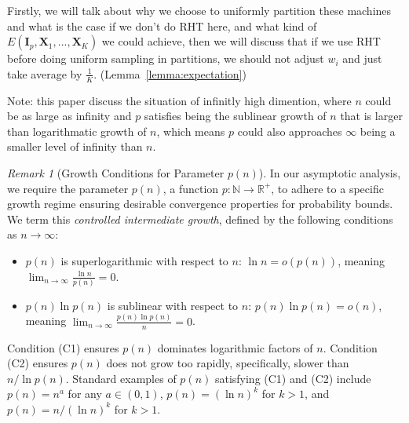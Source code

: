\documentclass[11pt]{article}
\numberwithin{equation}{section}
\theoremstyle{plain}
\theoremstyle{definition}
\theoremstyle{remark}
\newtheorem{remark}[theorem]{Remark}
\begin{document}
Firstly, we will talk about why we choose to uniformly partition these machines and what is the case if we don't do RHT here, and what kind of $E(\mathbf{I}_p,\mathbf{X}_1,...,\mathbf{X}_K)$ we could achieve, then we will discuss that if we use RHT before doing uniform sampling in partitions, we should not adjust $w_i$ and just take average by $\frac{1}{K}$. (Lemma~\ref{lemma:expectation})

Note: this paper discuss the situation of infinitly high dimention, where $n$ could be as large as infinity and $p$ satisfies being the sublinear growth of $n$ that is larger than logarithmatic growth of $n$, which means $p$ could also approaches $\infty$ being a smaller level of infinity than $n$.
\begin{remark}[Growth Conditions for Parameter $p(n)$]
\label{remark:sublinear}
In our asymptotic analysis, we require the parameter $p(n)$, a function $p: \mathbb{N} \to \mathbb{R}^+$, to adhere to a specific growth regime ensuring desirable convergence properties for probability bounds. We term this \emph{controlled intermediate growth}, defined by the following conditions as $n \to \infty$:
\begin{itemize}
    \item[(C1)] $p(n)$ is superlogarithmic with respect to $n$: $\ln n = o(p(n))$, meaning $\lim_{n \to \infty} \frac{\ln n}{p(n)} = 0$.
    \item[(C2)] $p(n)\ln p(n)$ is sublinear with respect to $n$: $p(n)\ln p(n) = o(n)$, meaning $\lim_{n \to \infty} \frac{p(n)\ln p(n)}{n} = 0$.
\end{itemize}
Condition (C1) ensures $p(n)$ dominates logarithmic factors of $n$. Condition (C2) ensures $p(n)$ does not grow too rapidly, specifically, slower than $n/\ln p(n)$. Standard examples of $p(n)$ satisfying (C1) and (C2) include $p(n) = n^a$ for any $a \in (0,1)$, $p(n) = (\ln n)^k$ for $k > 1$, and $p(n) = n/(\ln n)^k$ for $k > 1$.
\end{remark}
\end{document}
